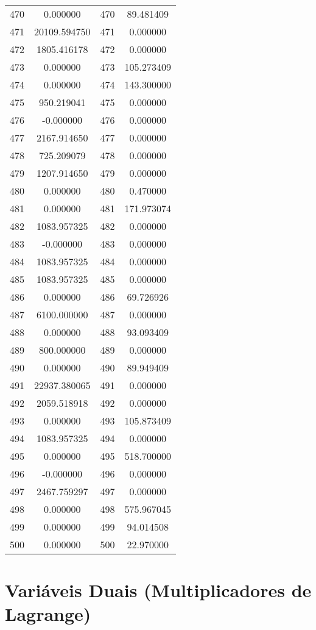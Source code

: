 \documentclass[12pt]{article}
\begin{document}
\begin{longtable}{@{}cccc@{}}
470 & 0.000000 & 470 & 89.481409 \\
471 & 20109.594750 & 471 & 0.000000 \\
472 & 1805.416178 & 472 & 0.000000 \\
473 & 0.000000 & 473 & 105.273409 \\
474 & 0.000000 & 474 & 143.300000 \\
475 & 950.219041 & 475 & 0.000000 \\
476 & -0.000000 & 476 & 0.000000 \\
477 & 2167.914650 & 477 & 0.000000 \\
478 & 725.209079 & 478 & 0.000000 \\
479 & 1207.914650 & 479 & 0.000000 \\
480 & 0.000000 & 480 & 0.470000 \\
481 & 0.000000 & 481 & 171.973074 \\
482 & 1083.957325 & 482 & 0.000000 \\
483 & -0.000000 & 483 & 0.000000 \\
484 & 1083.957325 & 484 & 0.000000 \\
485 & 1083.957325 & 485 & 0.000000 \\
486 & 0.000000 & 486 & 69.726926 \\
487 & 6100.000000 & 487 & 0.000000 \\
488 & 0.000000 & 488 & 93.093409 \\
489 & 800.000000 & 489 & 0.000000 \\
490 & 0.000000 & 490 & 89.949409 \\
491 & 22937.380065 & 491 & 0.000000 \\
492 & 2059.518918 & 492 & 0.000000 \\
493 & 0.000000 & 493 & 105.873409 \\
494 & 1083.957325 & 494 & 0.000000 \\
495 & 0.000000 & 495 & 518.700000 \\
496 & -0.000000 & 496 & 0.000000 \\
497 & 2467.759297 & 497 & 0.000000 \\
498 & 0.000000 & 498 & 575.967045 \\
499 & 0.000000 & 499 & 94.014508 \\
500 & 0.000000 & 500 & 22.970000 \\

\end{longtable}

\section{Variáveis Duais (Multiplicadores de Lagrange)}
\end{document}
